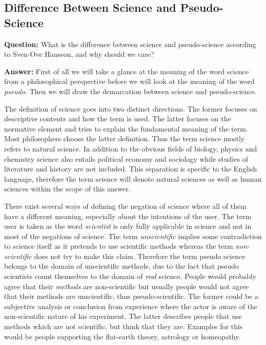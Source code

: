 \documentclass[11pt]{scrartcl}
\begin{document}
\subsection{Difference Between Science and Pseudo-Science}

\textbf{Question:} What is the difference between science and pseudo-science according to Sven-Ove Hansson, and why should we care?

\bigbreak

\textbf{Answer:} First of all we will take a glance at the meaning of the word science from a philosophical perspective before we will look at the meaning of the word \textit{pseudo}. Then we will draw the demarcation between science and pseudo-science.

The definition of science goes into two distinct directions. The former focuses on descriptive contents and how the term is used. The latter focuses on the normative element and tries to explain the fundamental meaning of the term. Most philosophers choose the latter definition. Thus the term science mostly refers to natural science. In addition to the obvious fields of biology, physics and chemistry science also entails political economy and sociology while studies of literature and history are not included. This separation is specific to the English language, therefore the term science will denote natural sciences as well as human sciences within the scope of this answer.

There exist several ways of defining the negation of science where all of them have a different meaning, especially about the intentions of the user. The term user is taken as the word \textit{scientist} is only fully applicable in science and not in most of the negations of science. The term \textit{unscientific} implies some contradiction to science itself as it pretends to use scientific methods whereas the term \textit{non-scientific} does not try to make this claim. Therefore the term pseudo science belongs to the domain of unscientific methods, due to the fact that pseudo scientists count themselves to the domain of \textit{real} science. People would probably agree that their \textit{methods} are non-scientific but usually people would not agree that their methods are unscientific, thus pseudo-scientific. The former could be a subjective analysis or conclusion from experience where the actor is aware of the non-scientific nature of his experiment. The latter describes people that use methods which are not scientific, but think that they are. Examples for this would be people supporting the flat-earth theory, astrology or homeopathy.
\end{document}
